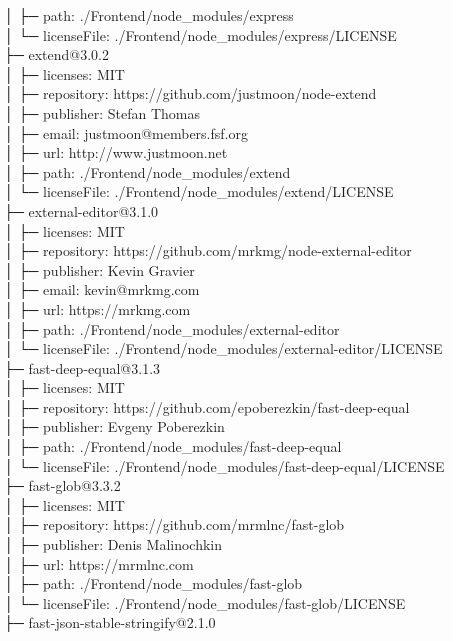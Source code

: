 │  ├─ path: ./Frontend/node\_modules/express\\
│  └─ licenseFile: ./Frontend/node\_modules/express/LICENSE\\
├─ extend@3.0.2\\
│  ├─ licenses: MIT\\
│  ├─ repository: https://github.com/justmoon/node-extend\\
│  ├─ publisher: Stefan Thomas\\
│  ├─ email: justmoon@members.fsf.org\\
│  ├─ url: http://www.justmoon.net\\
│  ├─ path: ./Frontend/node\_modules/extend\\
│  └─ licenseFile: ./Frontend/node\_modules/extend/LICENSE\\
├─ external-editor@3.1.0\\
│  ├─ licenses: MIT\\
│  ├─ repository: https://github.com/mrkmg/node-external-editor\\
│  ├─ publisher: Kevin Gravier\\
│  ├─ email: kevin@mrkmg.com\\
│  ├─ url: https://mrkmg.com\\
│  ├─ path: ./Frontend/node\_modules/external-editor\\
│  └─ licenseFile: ./Frontend/node\_modules/external-editor/LICENSE\\
├─ fast-deep-equal@3.1.3\\
│  ├─ licenses: MIT\\
│  ├─ repository: https://github.com/epoberezkin/fast-deep-equal\\
│  ├─ publisher: Evgeny Poberezkin\\
│  ├─ path: ./Frontend/node\_modules/fast-deep-equal\\
│  └─ licenseFile: ./Frontend/node\_modules/fast-deep-equal/LICENSE\\
├─ fast-glob@3.3.2\\
│  ├─ licenses: MIT\\
│  ├─ repository: https://github.com/mrmlnc/fast-glob\\
│  ├─ publisher: Denis Malinochkin\\
│  ├─ url: https://mrmlnc.com\\
│  ├─ path: ./Frontend/node\_modules/fast-glob\\
│  └─ licenseFile: ./Frontend/node\_modules/fast-glob/LICENSE\\
├─ fast-json-stable-stringify@2.1.0\\
